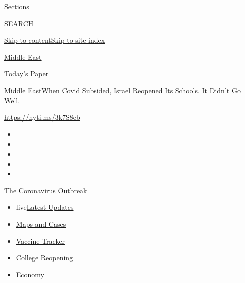 Sections

SEARCH

\protect\hyperlink{site-content}{Skip to
content}\protect\hyperlink{site-index}{Skip to site index}

\href{https://www.nytimes3xbfgragh.onion/section/world/middleeast}{Middle
East}

\href{https://myaccount.nytimes3xbfgragh.onion/auth/login?response_type=cookie\&client_id=vi}{}

\href{https://www.nytimes3xbfgragh.onion/section/todayspaper}{Today's
Paper}

\href{/section/world/middleeast}{Middle East}\textbar{}When Covid
Subsided, Israel Reopened Its Schools. It Didn't Go Well.

\url{https://nyti.ms/3k7S8eb}

\begin{itemize}
\item
\item
\item
\item
\item
\end{itemize}

\href{https://www.nytimes3xbfgragh.onion/news-event/coronavirus?action=click\&pgtype=Article\&state=default\&region=TOP_BANNER\&context=storylines_menu}{The
Coronavirus Outbreak}

\begin{itemize}
\tightlist
\item
  live\href{https://www.nytimes3xbfgragh.onion/2020/08/03/world/coronavirus-covid-19.html?action=click\&pgtype=Article\&state=default\&region=TOP_BANNER\&context=storylines_menu}{Latest
  Updates}
\item
  \href{https://www.nytimes3xbfgragh.onion/interactive/2020/us/coronavirus-us-cases.html?action=click\&pgtype=Article\&state=default\&region=TOP_BANNER\&context=storylines_menu}{Maps
  and Cases}
\item
  \href{https://www.nytimes3xbfgragh.onion/interactive/2020/science/coronavirus-vaccine-tracker.html?action=click\&pgtype=Article\&state=default\&region=TOP_BANNER\&context=storylines_menu}{Vaccine
  Tracker}
\item
  \href{https://www.nytimes3xbfgragh.onion/2020/08/02/us/covid-college-reopening.html?action=click\&pgtype=Article\&state=default\&region=TOP_BANNER\&context=storylines_menu}{College
  Reopening}
\item
  \href{https://www.nytimes3xbfgragh.onion/live/2020/08/03/business/stock-market-today-coronavirus?action=click\&pgtype=Article\&state=default\&region=TOP_BANNER\&context=storylines_menu}{Economy}
\end{itemize}

